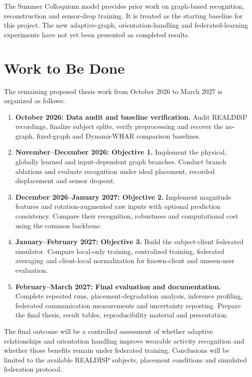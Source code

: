 \documentclass[10pt,a4paper,oneside,openany]{report}
\begin{document}
The Summer Colloquium model provides prior work on graph-based recognition, reconstruction and sensor-drop training. It is treated as the starting baseline for this project. The new adaptive-graph, orientation-handling and federated-learning experiments have not yet been presented as completed results.

\section{Work to Be Done}

The remaining proposed thesis work from October 2026 to March 2027 is organized as follows:

\begin{enumerate}
\item \textbf{October 2026: Data audit and baseline verification.} Audit REALDISP recordings, finalize subject splits, verify preprocessing and recover the no-graph, fixed-graph and DynamicWHAR comparison baselines.

\item \textbf{November--December 2026: Objective 1.} Implement the physical, globally learned and input-dependent graph branches. Conduct branch ablations and evaluate recognition under ideal placement, recorded displacement and sensor dropout.

\item \textbf{December 2026--January 2027: Objective 2.} Implement magnitude features and rotation-augmented raw inputs with optional prediction consistency. Compare their recognition, robustness and computational cost using the common backbone.

\item \textbf{January--February 2027: Objective 3.} Build the subject-client federated simulator. Compare local-only training, centralized training, federated averaging and client-local normalization for known-client and unseen-user evaluation.

\item \textbf{February--March 2027: Final evaluation and documentation.} Complete repeated runs, placement-degradation analysis, inference profiling, federated communication measurements and uncertainty reporting. Prepare the final thesis, result tables, reproducibility material and presentation.
\end{enumerate}

The final outcome will be a controlled assessment of whether adaptive relationships and orientation handling improve wearable activity recognition and whether those benefits remain under federated training. Conclusions will be limited to the available REALDISP subjects, placement conditions and simulated federation protocol.
\end{document}
